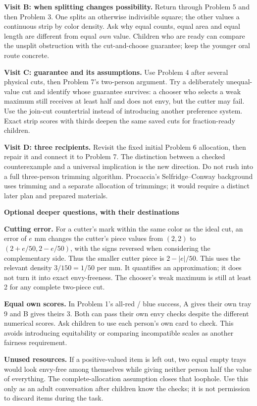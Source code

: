 \documentclass[11pt]{article}
\newcommand{\subhead}[1]{\par\vspace{1mm}\textbf{#1}\par}
\begin{document}
\textbf{Visit B: when splitting changes possibility.} Return through Problem 5 and then Problem 3. One splits an otherwise indivisible square; the other values a continuous strip by color density. Ask why equal counts, equal area and equal length are different from equal \emph{own} value. Children who are ready can compare the unsplit obstruction with the cut-and-choose guarantee; keep the younger oral route concrete.

\textbf{Visit C: guarantee and its assumptions.} Use Problem 4 after several physical cuts, then Problem 7's two-person argument. Try a deliberately unequal-value cut and identify whose guarantee survives: a chooser who selects a weak maximum still receives at least half and does not envy, but the cutter may fail. Use the join-cut countertrial instead of introducing another preference system. Exact strip scores with thirds deepen the same saved cuts for fraction-ready children.

\textbf{Visit D: three recipients.} Revisit the fixed initial Problem 6 allocation, then repair it and connect it to Problem 7. The distinction between a checked counterexample and a universal implication is the new direction. Do not rush into a full three-person trimming algorithm. Procaccia's Selfridge--Conway background uses trimming and a separate allocation of trimmings; it would require a distinct later plan and prepared materials.

\subhead{Optional deeper questions, with their destinations}
\textbf{Cutting error.} For a cutter's mark within the same color as the ideal cut, an error of $e$ mm changes the cutter's piece values from $(2,2)$ to $(2+e/50,2-e/50)$, with the signs reversed when considering the complementary side. Thus the smaller cutter piece is $2-|e|/50$. This uses the relevant density $3/150=1/50$ per mm. It quantifies an approximation; it does not turn it into exact envy-freeness. The chooser's weak maximum is still at least 2 for any complete two-piece cut.

\textbf{Equal own scores.} In Problem 1's all-red / blue success, A gives their own tray 9 and B gives theirs 3. Both can pass their own envy checks despite the different numerical scores. Ask children to use each person's own card to check. This avoids introducing equitability or comparing incompatible scales as another fairness requirement.

\textbf{Unused resources.} If a positive-valued item is left out, two equal empty trays would look envy-free among themselves while giving neither person half the value of everything. The complete-allocation assumption closes that loophole. Use this only as an adult conversation after children know the checks; it is not permission to discard items during the task.
\end{document}

